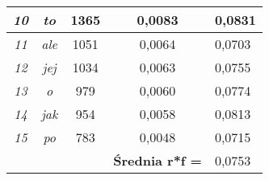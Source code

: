 \documentclass[a4paper]{article}
\begin{document}
\begin{table}
\begin{tabular}{ccc|c|l|}
\multicolumn{1}{|c|}{\textit{10}}                & \multicolumn{1}{c|}{\textit{to}}    & 1365                              & 0,0083                                     & 0,0831 \\ \hline
\multicolumn{1}{|c|}{\textit{11}}                & \multicolumn{1}{c|}{\textit{ale}}   & 1051                              & 0,0064                                     & 0,0703 \\ \hline
\multicolumn{1}{|c|}{\textit{12}}                & \multicolumn{1}{c|}{\textit{jej}}   & 1034                              & 0,0063                                     & 0,0755 \\ \hline
\multicolumn{1}{|c|}{\textit{13}}                & \multicolumn{1}{c|}{\textit{o}}     & 979                               & 0,0060                                     & 0,0774 \\ \hline
\multicolumn{1}{|c|}{\textit{14}}                & \multicolumn{1}{c|}{\textit{jak}}   & 954                               & 0,0058                                     & 0,0813 \\ \hline
\multicolumn{1}{|c|}{\textit{15}}                & \multicolumn{1}{c|}{\textit{po}}    & 783                               & 0,0048                                     & 0,0715 \\ \hline
\multicolumn{1}{l}{}                             &                                     &                                   & \textbf{Średnia r*f =}                     & 0,0753 \\ \cline{4-5} 
\end{tabular}
\end{table}
\end{document}
